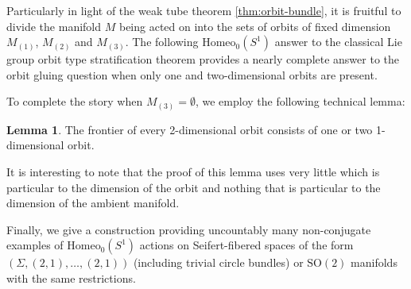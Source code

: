 \documentclass[10pt, oneside]{article}
\newcommand{\SO}[1][2]{\text{SO}(#1)}
\newcommand{\homeo}[1][S^1]{\text{Homeo}_0(#1)}
\theoremstyle{definition}
\newtheorem{rem}{Remark}[section]
\newtheorem{lem}{Lemma}[section]
\theoremstyle{definition}
\begin{document}
\thmglobaltop*

Particularly in light of the weak tube theorem \cref{thm:orbit-bundle}, it is fruitful to divide the manifold $M$ being acted on into the sets of orbits of fixed dimension $M_{(1)}$, $M_{(2)}$ and $M_{(3)}$. The following $\homeo$ answer to the classical Lie group orbit type stratification theorem provides a nearly complete answer to the orbit gluing question when only one and two-dimensional orbits are present.

\weakotstratif*

To complete the story when $M_{(3)}=\emptyset$, we employ the following technical lemma:
\begin{lem}
    The frontier of every 2-dimensional orbit consists of one or two 1-dimensional orbit.
\end{lem}
It is interesting to note that the proof of this lemma uses very little which is particular to the dimension of the orbit and nothing that is particular to the dimension of the ambient manifold.


Finally, we give a construction providing uncountably many non-conjugate examples of $\homeo$ actions on Seifert-fibered spaces of the form $(\Sigma, (2, 1), \dots, (2, 1))$ (including trivial circle bundles) or $\SO$ manifolds with the same restrictions.

\end{document}
